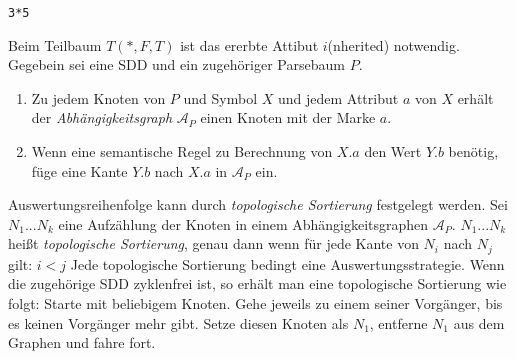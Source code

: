 \verb!3*5!
\begin{center}
\end{center}
Beim Teilbaum $T(\texttt{*},F,T)$ ist das ererbte Attibut $i$(nherited) notwendig.
\Defi Gegebein sei eine SDD und ein zugehöriger Parsebaum $P$.
\begin{enumerate}
 \item Zu jedem Knoten von $P$ und Symbol $X$ und jedem Attribut $a$ von $X$ erhält der \emph{Abhängigkeitsgraph} $\mathcal{A}_P$ einen Knoten mit der Marke $a$.
 \item Wenn eine semantische Regel zu Berechnung von $X.a$ den Wert $Y.b$ benötig, füge eine Kante $Y.b$ nach $X.a$ in $\mathcal{A}_P$ ein.
\end{enumerate}
Auswertungsreihenfolge kann durch \emph{topologische Sortierung} festgelegt werden.
\Defi Sei $N_1...N_k$ eine Aufzählung der Knoten in einem Abhängigkeitsgraphen $\mathcal{A}_P$. $N_1...N_k$ heißt \emph{topologische Sortierung}, genau dann wenn für jede Kante von $N_i$ nach $N_j$ gilt: $i < j$
\Lemma Jede topologische Sortierung bedingt eine Auswertungsstrategie.
\Satz Wenn die zugehörige SDD zyklenfrei ist, so erhält man eine topologische Sortierung wie folgt:
\Bew Starte mit beliebigem Knoten. Gehe jeweils zu einem seiner Vorgänger, bis es keinen Vorgänger mehr gibt. Setze diesen Knoten als $N_1$, entferne $N_1$ aus dem Graphen und fahre fort.
